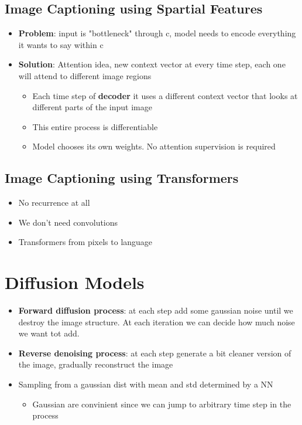 \subsection{Image Captioning using Spartial Features}
\begin{itemize}
    \item \textbf{Problem}: input is "bottleneck" through c, model needs to encode everything it wants to say within c
    \item \textbf{Solution}: Attention idea, new context vector at every time step, each one will attend to different image regions
    \begin{itemize}
        \item Each time step of \textbf{decoder} it uses a different context vector that looks at different parts of the input image
        \item This entire process is differentiable
        \item Model chooses its own weights. No attention supervision is required
    \end{itemize}
\end{itemize}

\subsection{Image Captioning using Transformers}
\begin{itemize}
    \item No recurrence at all
    \item We don't need convolutions
    \item Transformers from pixels to language
\end{itemize}


\section{Diffusion Models}
\begin{itemize}
    \item \textbf{Forward diffusion process}: at each step add some gaussian noise until we destroy the image structure. At each iteration we can decide how much noise we want tot add.
    \item \textbf{Reverse denoising process}: at each step generate a bit cleaner version of the image, gradually reconstruct the image
    \item Sampling from a gaussian dist with mean and std determined by a NN
    \begin{itemize}
        \item Gaussian are convinient since we can jump to arbitrary time step in the process
    \end{itemize}
\end{itemize}

